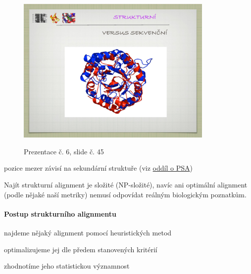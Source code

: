\documentclass[DIV=8]{scrreprt}
\begin{document}
\begin{myItemize}[nosep]
\begin{figure}
    \centering
    \label{slides-6-slide-43}
\end{figure}
\begin{figure}
    \caption{Prezentace č. 6, slide č. 45}
    \includegraphics[width=0.85\textwidth]{slides-6/slide-45.jpg}
    \centering
    \label{slides-6-slide-45}
\end{figure}

\begin{myItemize}[nosep]
    \item pozice mezer závisí na sekundární struktuře (viz \hyperref[Pairwise sequence alignment]{oddíl o PSA})
\end{myItemize}

\end{myItemize}



Najít strukturní alignment je složité (NP-složité), navíc ani optimální alignment (podle nějaké naší metriky) nemusí odpovídat reálným biologickým poznatkům.

\paragraph{Postup strukturního alignmentu}
\begin{myEnumerate}[nosep]
    \item najdeme nějaký alignment pomocí heuristických metod
    \item optimalizujeme jej dle předem stanovených kritérií
    \item zhodnotíme jeho statistickou významnost
\end{myEnumerate}
\end{document}
